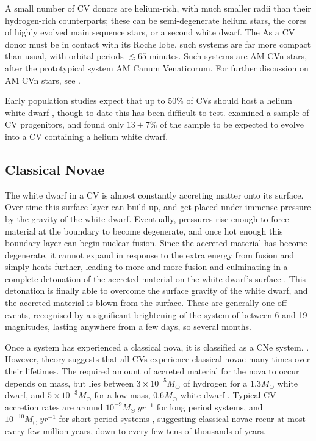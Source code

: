 A small number of CV donors are helium-rich, with much smaller radii than their hydrogen-rich counterparts; these can be semi-degenerate helium stars, the cores of highly evolved main sequence stars, or a second white dwarf. The  As a CV donor must be in contact with its Roche lobe, such systems are far more compact than usual, with orbital periods $\lesssim 65$ minutes. Such systems are AM CVn stars, after the prototypical system AM Canum Venaticorum. For further discussion on AM CVn stars, see \citep{solheim2010}.

Early population studies expect that up to 50\% of CVs should host a helium white dwarf \citep{politano1996}, though to date this has been difficult to test. \citet{zorotovic2010} examined a sample of CV progenitors, and found only $13\pm7\%$ of the sample to be expected to evolve into a CV containing a helium white dwarf.


\subsection{Classical Novae}
\label{sect:introduction:classical novae}

The white dwarf in a CV is almost constantly accreting matter onto its surface. Over time this surface layer can build up, and get placed under immense pressure by the gravity of the white dwarf. Eventually, pressures rise enough to force material at the boundary to become degenerate, and once hot enough this boundary layer can begin nuclear fusion. 
Since the accreted material has become degenerate, it cannot expand in response to the extra energy from fusion and simply heats further, leading to more and more fusion and culminating in a complete detonation of the accreted material on the white dwarf's surface \citep{warner1995}. This detonation is finally able to overcome the surface gravity of the white dwarf, and the accreted material is blown from the surface.
These are generally one-off events, recognised by a significant brightening of the system of between 6 and 19 magnitudes, lasting anywhere from a few days, so several months. 

Once a system has experienced a classical nova, it is classified as a CNe system. \citep{warner1995}. However, theory suggests that all CVs experience classical novae many times over their lifetimes. The required amount of accreted material for the nova to occur depends on mass, but lies between $3\times10^{-5} M_\odot$ of hydrogen for a $1.3 M_\odot$ white dwarf, and $5\times10^{-3} M_\odot$ for a low mass, $0.6 M_\odot$ white dwarf \citep{hellier2001}. Typical CV accretion rates are around $10^{-9} M_\odot\ yr^{-1}$ for long period systems, and $10^{-10} M_\odot\ yr^{-1}$ for short period systems \citep{hellier2001, Pala2021}, suggesting classical novae recur at most every few million years, down to every few tens of thousands of years.

